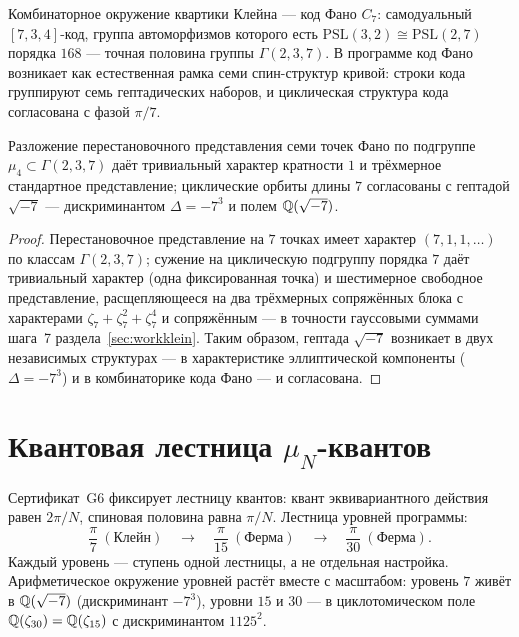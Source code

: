 Комбинаторное окружение квартики Клейна --- код Фано $C_7$:
самодуальный $[7,3,4]$-код, группа автоморфизмов которого есть
$\mathrm{PSL}(3,2)\cong\mathrm{PSL}(2,7)$ порядка $168$ ---
точная половина группы $\Gamma(2,3,7)$. В программе код Фано
возникает как естественная рамка семи спин-структур кривой:
строки кода группируют семь гептадических наборов, и циклическая
структура кода согласована с фазой $\pi/7$.

\begin{proposition}\label{prop:fano}
Разложение перестановочного представления семи точек Фано по
подгруппе $\mu_4\subset\Gamma(2,3,7)$ даёт тривиальный характер
кратности $1$ и трёхмерное стандартное представление; циклические
орбиты длины $7$ согласованы с гептадой $\sqrt{-7}$ ---
дискриминантом $\Delta=-7^3$ и полем $\mathbb{Q}(\sqrt{-7})$.
\end{proposition}

\begin{proof}
Перестановочное представление на $7$ точках имеет характер
$(7,1,1,\dots)$ по классам $\Gamma(2,3,7)$; сужение на циклическую
подгруппу порядка $7$ даёт тривиальный характер (одна фиксированная
точка) и шестимерное свободное представление, расщепляющееся на два
трёхмерных сопряжённых блока с характерами $\zeta_7+\zeta_7^2+
\zeta_7^4$ и сопряжённым --- в точности гауссовыми суммами шага~7
раздела~\ref{sec:workklein}. Таким образом, гептада $\sqrt{-7}$
возникает в двух независимых структурах --- в характеристике
эллиптической компоненты ($\Delta=-7^3$) и в комбинаторике кода
Фано --- и согласована.
\end{proof}

\section{Квантовая лестница $\mu_N$-квантов}\label{sec:quantumladder}

Сертификат~G6 фиксирует лестницу квантов: квант эквивариантного
действия равен $2\pi/N$, спиновая половина равна $\pi/N$. Лестница
уровней программы:
\[
  \frac{\pi}{7}\ (\text{Клейн})\quad\longrightarrow\quad
  \frac{\pi}{15}\ (\text{Ферма})\quad\longrightarrow\quad
  \frac{\pi}{30}\ (\text{Ферма}).
\]
Каждый уровень --- ступень одной лестницы, а не отдельная настройка.
Арифметическое окружение уровней растёт вместе с масштабом: уровень
$7$ живёт в $\mathbb{Q}(\sqrt{-7})$ (дискриминант $-7^3$), уровни $15$ и
$30$ --- в циклотомическом поле $\mathbb{Q}(\zeta_{30})=\mathbb{Q}(\zeta_{15})$
с дискриминантом $1125^2$.

